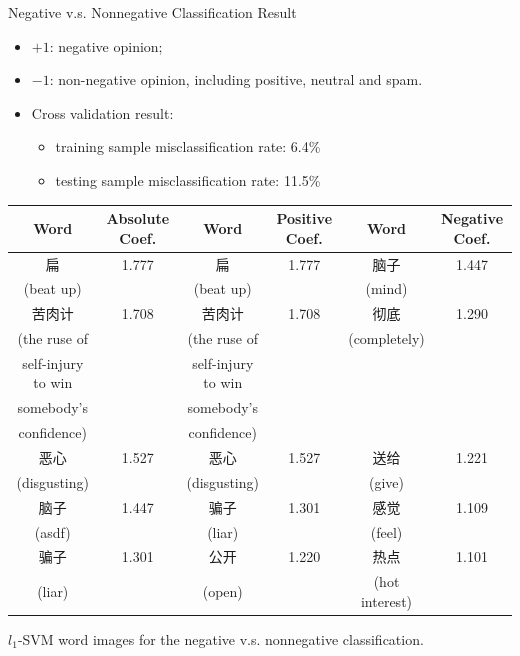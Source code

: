 \documentclass[12pt]{beamer}
\newcommand{\1}[1]{{\mathbf 1}\left\{#1\right\}}        %
\begin{document}
\begin{frame}{Negative v.s. Nonnegative Classification Result}
\footnotesize
\begin{itemize}[<+->]
\item $+1$: negative opinion;
\item $-1$: non-negative opinion, including positive, neutral and spam.
\item Cross validation result: 
  \begin{itemize}[<+->]
  \item training sample misclassification rate: 6.4\%
  \item testing sample misclassification rate: 11.5\%
  \end{itemize}

\end{itemize}


\vspace{-3pt}
\tiny
\begin{tabular}{|c|c||c|c||c|c|}
\hline
Word & Absolute Coef. & Word & Positive Coef. & Word & Negative Coef.\\ \hline  \hline
扁 & 1.777 & 扁 & 1.777 & 脑子 & 1.447\\
(beat up) & & (beat up) & & (mind) & \\\hline
苦肉计 & 1.708 & 苦肉计 & 1.708 & 彻底 & 1.290\\
(the ruse of  & & (the ruse of  &  &  (completely) &  \\
self-injury to win & &  self-injury to win &  & &  \\
somebody's & & somebody's  &  & &  \\
 confidence) & &  confidence)  &  & &  \\\hline
恶心 & 1.527 & 恶心 & 1.527 & 送给 & 1.221\\
(disgusting) & & (disgusting) & & (give) & \\\hline
脑子 & 1.447 & 骗子 & 1.301 & 感觉 & 1.109\\
(asdf) & & (liar) & & (feel) & \\\hline
骗子 & 1.301 & 公开 & 1.220 & 热点 & 1.101\\
(liar) & & (open) & & (hot interest) & \\\hline
\end{tabular}
\begin{center}
$l_1$-SVM word images for the negative v.s. nonnegative classification.
\end{center}

\end{frame}
\end{document}
